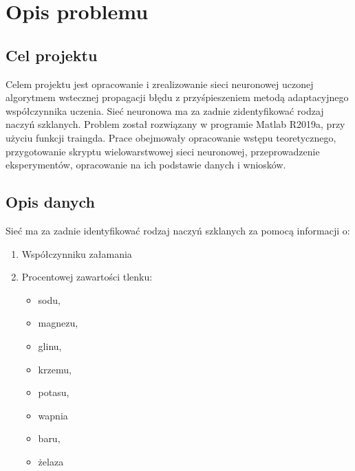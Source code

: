 \documentclass[a4paper, openright, twoside,11pt]{article}
\begin{document}
    
    \newpage\null\thispagestyle{blank}\newpage
    \tableofcontents    
    \thispagestyle{empty}
    \newpage\null\thispagestyle{blank}
    
    \newpage
    
    \newpage
    \setcounter{page}{5}
    
    
    \section{Opis problemu}
    \subsection{Cel projektu}
    Celem projektu jest opracowanie i zrealizowanie sieci neuronowej uczonej algorytmem wstecznej propagacji błędu z przyśpieszeniem metodą adaptacyjnego współczynnika uczenia. Sieć neuronowa ma za zadnie zidentyfikować rodzaj naczyń szklanych. Problem został rozwiązany w programie Matlab R2019a, przy użyciu funkcji traingda.
    Prace obejmowały opracowanie wstępu teoretycznego, przygotowanie skryptu wielowarstwowej sieci neuronowej, przeprowadzenie eksperymentów, opracowanie na ich podstawie danych i wniosków. 

    \subsection{Opis danych}
    Sieć ma za zadnie identyfikować rodzaj naczyń szklanych za pomocą informacji o:
    
    \begin{enumerate}
        \item Współczynniku załamania
        \item Procentowej zawartości tlenku:
             \begin{itemize}
             \item sodu,
             \item magnezu,
            \item glinu,
            \item krzemu,
            \item potasu,
            \item wapnia
            \item baru,
            \item żelaza
            \end{itemize}
        \end{enumerate}
        
\end{document}
